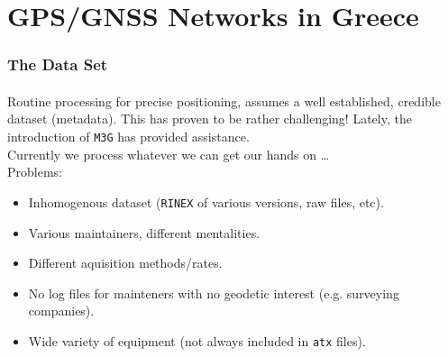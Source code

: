 %

\section{GPS/GNSS Networks in Greece}
\begin{frame}\frametitle{The Data Set}\framesubtitle{}
\vskip-1.5cm
  Routine processing for precise positioning, assumes a well established, 
  credible dataset (metadata). This has proven to be rather challenging! Lately, 
  the introduction of \texttt{M3G} has provided assistance.\\
  \bigskip
  Currently we process whatever we can get our hands on \ldots\\
  Problems:
  \begin{itemize}
    \item Inhomogenous dataset (\texttt{RINEX} of various versions, raw files, etc).
    \item Various maintainers, different mentalities.
    \item Different aquisition methods/rates.
    \item No log files for mainteners with no geodetic interest (e.g. surveying companies).
    \item Wide variety of equipment (not always included in \texttt{atx} files).
  \end{itemize}
\end{frame}
\note

